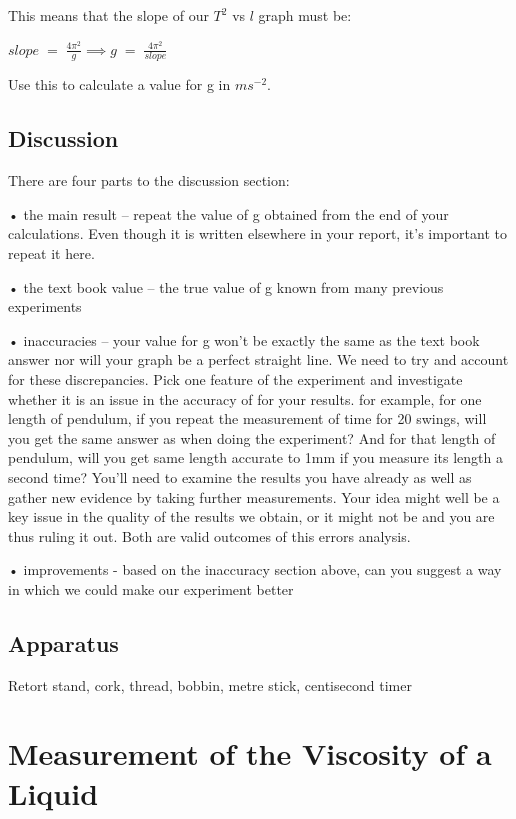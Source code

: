 \documentclass[
  letterpaper,
  DIV=11,
  numbers=noendperiod]{scrreprt}
\begin{document}
This means that the slope of our \(T^2\) vs \(l\) graph must be:

\(slope \; = \; \frac{4\pi^2}{g} \implies g \; = \; \frac{4\pi^2}{slope}\)

Use this to calculate a value for g in \(m s^{-2}\).

\section{Discussion}\label{discussion}

There are four parts to the discussion section:

• the main result -- repeat the value of g obtained from the end of your
calculations. Even though it is written elsewhere in your report, it's
important to repeat it here.

• the text book value -- the true value of g known from many previous
experiments

• inaccuracies -- your value for g won't be exactly the same as the text
book answer nor will your graph be a perfect straight line. We need to
try and account for these discrepancies. Pick one feature of the
experiment and investigate whether it is an issue in the accuracy of for
your results. for example, for one length of pendulum, if you repeat the
measurement of time for 20 swings, will you get the same answer as when
doing the experiment? And for that length of pendulum, will you get same
length accurate to 1mm if you measure its length a second time? You'll
need to examine the results you have already as well as gather new
evidence by taking further measurements. Your idea might well be a key
issue in the quality of the results we obtain, or it might not be and
you are thus ruling it out. Both are valid outcomes of this errors
analysis.

• improvements - based on the inaccuracy section above, can you suggest
a way in which we could make our experiment better

\section{Apparatus}\label{apparatus-1}

Retort stand, cork, thread, bobbin, metre stick, centisecond timer


\chapter{Measurement of the Viscosity of a
Liquid}\label{measurement-of-the-viscosity-of-a-liquid}
\end{document}
